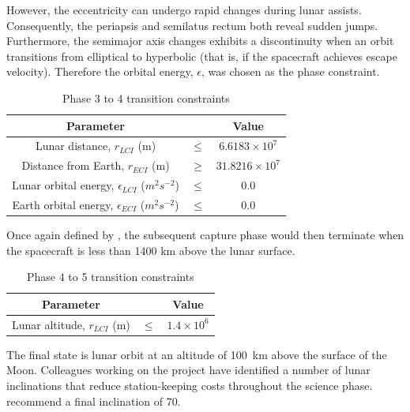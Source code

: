 However, the eccentricity can undergo rapid changes during lunar assists. Consequently, the periapsis and semilatus rectum both reveal sudden jumps. Furthermore, the semimajor axis changes exhibits a discontinuity when an orbit transitions from elliptical to hyperbolic (that is, if the spacecraft achieves escape velocity). Therefore the orbital energy, $\epsilon$, was chosen as the phase constraint.

\begin{table}[h]
\caption{Phase 3 to 4 transition constraints}
\label{tab:Phase-3-4-constraints}
\begin{center}
\begin{tabular} {ccc}\toprule
Parameter & & Value\\\midrule
Lunar distance, $r_{LCI}$ (m) &$\le$& $6.6183\times 10^7$\\\midrule
Distance from Earth, $r_{ECI}$ (m) &$\ge$& $31.8216\times 10^7$\\\midrule
Lunar orbital energy, $\epsilon_{LCI}$ ($m^2s^{-2}$) &$\le$& 0.0 \\\midrule
Earth orbital energy, $\epsilon_{ECI}$ ($m^2s^{-2}$) &$\le$& 0.0 \\\bottomrule
\end{tabular}
\end{center}
\end{table}

Once again defined by \citeauthor{Roeser2006}, the subsequent capture phase would then terminate when the spacecraft is less than 1400 km above the lunar surface.

\begin{table}[h]
\caption{Phase 4 to 5 transition constraints}
\label{tab:Phase-4-5-constraints}
\begin{center}
\begin{tabular} {ccc}\toprule
Parameter && Value\\\midrule
Lunar altitude, $r_{LCI}$ (m) &$\le$& $1.4\times 10^6$\\\bottomrule
\end{tabular}
\end{center}
\end{table}

The final state is lunar orbit at an altitude of 100~km above the surface of the Moon. Colleagues working on the project have identified a number of lunar inclinations that reduce station-keeping costs throughout the science phase. \textcite{Zeile2010} recommend a final inclination of 70\degrees.

